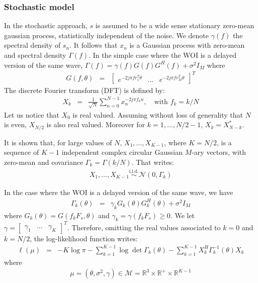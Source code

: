 \documentclass[graybox]{svmult/styles/svmult}
\def\simiid{\stackrel{\mathrm{i.i.d.}}{\sim}}
\begin{document}
  \subsubsection{Stochastic model}
 In the stochastic approach, $s$ is assumed to be a wide sense stationary zero-mean gaussian process, statistically independent of the noise. We denote $\gamma(f)$ the spectral density of $s_{n}$. It follows that $x_{n}$ is a Gaussian process with zero-mean and spectral density $\Gamma(f)$. In the simple case where the WOI is a delayed version of the same wave, $\Gamma(f)= \gamma(f)G(f)G^{H}(f)+\sigma^{2}I_{M}$ where 
  \begin{eqnarray*}
  G(f,\theta)	&=&\begin{bmatrix}
  e^{-2j\pi fr^{T}_{1}\theta}&\ldots&e^{-2j\pi fr^{T}_{M}\theta}
  \end{bmatrix}^{T}
  \end{eqnarray*}
 The discrete Fourier transform (DFT) is defined by:
  \begin{eqnarray*}
  X_{k}&=&\frac{1}{\sqrt{N}}\sum_{n=0}^{N-1}x_{n}^{-2j\pi f_{k}n},\quad \text{with}\,\, f_{k}=k/N
  \end{eqnarray*}
Let us notice that $X_{0}$ is real valued. Assuming without loss of generality that $N$ is even, $X_{N/2}$ is also real valued. Moreover for $k=1,\ldots, N/2-1$, $X_{k}=X_{N-k}^{*}$.

It is shown \cite{clt-peligrad2009} that, for large values of $N$, $X_{1},\ldots,X_{K-1}$, where $K=N/2$, is a sequence of $K-1$ independent complex circular Gaussian $M$-ary vectors,  with zero-mean and covariance $\Gamma_{k}= \Gamma(k/N)$.  That writes:
\begin{eqnarray}
\label{eq:stochastic-frequency-model}
X_{1},\ldots,X_{K-1} \simiid \mathcal{N}(0,\Gamma_{k})
\end{eqnarray}

In the case where the WOI is a delayed version of the same wave, we have 
\begin{eqnarray}
 \label{eq:spectralmatrix-coherent}
\Gamma_{k}(\theta)&=&\gamma_{k} G_{k}(\theta)G^{H}_{k}(\theta)+\sigma^{2}I_{M}
\end{eqnarray}
where $G_{k}(\theta)=G(f_{k}F_{s},\theta)$ and $\gamma_{k}=\gamma(f_{k}F_{s})\geq 0$. We let $\gamma=\begin{bmatrix} \gamma_{1}&\ldots& \gamma_{K} \end{bmatrix}^{T}$.  Therefore, omitting the real values associated to $k=0$ and $k=N/2$, the log-likelihood function writes:
 \begin{eqnarray}
 \label{eq:loglikelihood-stochastic}
 \ell(\mu)&=&-K\log \pi-\sum_{k=1}^{K-1}\log \det \Gamma_{k}(\theta)
 -
\sum_{k=1}^{K-1}X_{k}^{H}\Gamma_{k}^{-1}(\theta)X_{k}
 \end{eqnarray}
 where
\begin{eqnarray}
  \label{eq:poistochastic}
  \mu=(\theta,\sigma^{2},\gamma)\in\mathcal{M}=\mathds{R}^{3}\times \mathds{R}^{+}\times \mathds{R}^{K-1}
\end{eqnarray}
 
\end{document}
